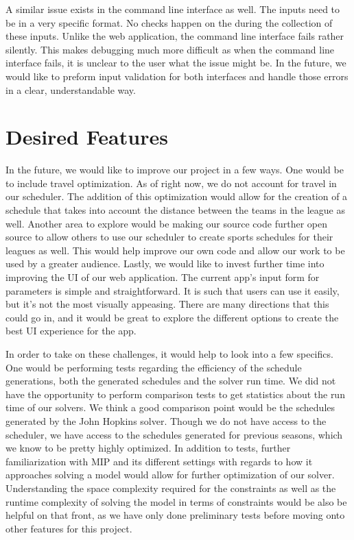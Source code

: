 \documentclass[book]{hmcclinic}
\begin{document}
A similar issue exists in the command line interface as well. The inputs need to be in a very specific format. No checks happen on the during the collection of these inputs. Unlike the web application, the command line interface fails rather silently. This makes debugging much more difficult as when the command line interface fails, it is unclear to the user what the issue might be. In the future, we would like to preform input validation for both interfaces and handle those errors in a clear, understandable way.

\section{Desired Features}
In the future, we would like to improve our project in a few ways. One would be to include travel optimization. As of right now, we do not account for travel in our scheduler. The addition of this optimization would allow for the creation of a schedule that takes into account the distance between the teams in the league as well. Another area to explore would be making our source code further open source to allow others to use our scheduler to create sports schedules for their leagues as well. This would help improve our own code and allow our work to be used by a greater audience. Lastly, we would like to invest further time into improving the UI of our web application. The current app's input form for parameters is simple and straightforward. It is such that users can use it easily, but it's not the most visually appeasing. There are many directions that this could go in, and it would be great to explore the different options to create the best UI experience for the app.  

In order to take on these challenges, it would help to look into a few specifics. One would be performing tests regarding the efficiency of the schedule generations, both the generated schedules and the solver run time. We did not have the opportunity to perform comparison tests to get statistics about the run time of our solvers. We think a good comparison point would be the schedules generated by the John Hopkins solver. Though we do not have access to the scheduler, we have access to the schedules generated for previous seasons, which we know to be pretty highly optimized. In addition to tests, further familiarization with MIP and its different settings with regards to how it approaches solving a model would allow for further optimization of our solver. Understanding the space complexity required for the constraints as well as the runtime complexity of solving the model in terms of constraints would be also be helpful on that front, as we have only done preliminary tests before moving onto other features for this project.
\end{document}
